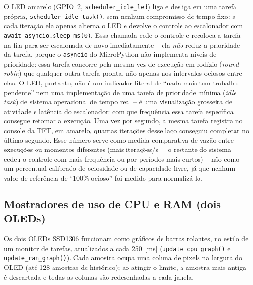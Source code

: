 \documentclass[12pt,a4paper]{article}
\begin{document}
O LED amarelo (GPIO~2, \texttt{scheduler\_idle\_led}) liga e desliga em uma tarefa própria, \texttt{scheduler\_idle\_task()}, sem nenhum compromisso de tempo fixo: a cada iteração ela apenas alterna o LED e devolve o controle ao escalonador com \texttt{await asyncio.sleep\_ms(0)}. Essa chamada cede o controle e recoloca a tarefa na fila para ser escalonada de novo imediatamente -- ela \emph{não} reduz a prioridade da tarefa, porque o \texttt{asyncio} do MicroPython não implementa níveis de prioridade: essa tarefa concorre pela mesma vez de execução em rodízio (\textit{round-robin}) que qualquer outra tarefa pronta, não apenas nos intervalos ociosos entre elas. O LED, portanto, não é um indicador literal de \enquote{nada mais tem trabalho pendente} nem uma implementação de uma tarefa de prioridade mínima (\textit{idle task}) de sistema operacional de tempo real -- é uma visualização grosseira de atividade e latência do escalonador: com que frequência essa tarefa específica consegue retomar a execução. Uma vez por segundo, a mesma tarefa registra no console da TFT, em amarelo, quantas iterações desse laço conseguiu completar no último segundo. Esse número serve como medida comparativa de vazão entre execuções ou momentos diferentes (mais iterações/s = o restante do sistema cedeu o controle com mais frequência ou por períodos mais curtos) -- não como um percentual calibrado de ociosidade ou de capacidade livre, já que nenhum valor de referência de \enquote{100\% ocioso} foi medido para normalizá-lo.

\subsection{Mostradores de uso de CPU e RAM (dois OLEDs)}
\label{sec:oled-graphs}

Os dois OLEDs SSD1306 funcionam como gráficos de barras rolantes, no estilo de um monitor de tarefas, atualizados a cada 250~[ms] (\texttt{update\_cpu\_graph()} e \texttt{update\_ram\_graph()}). Cada amostra ocupa uma coluna de pixels na largura do OLED (até 128 amostras de histórico); ao atingir o limite, a amostra mais antiga é descartada e todas as colunas são redesenhadas a cada janela.
\end{document}
